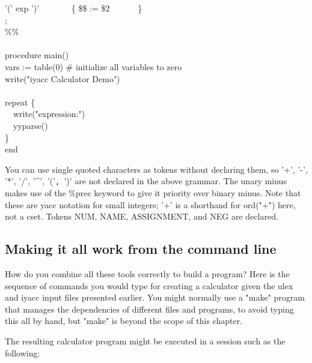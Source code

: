 {\>   {\textbar} '(' exp
')' \ \ \ \ \ \ \ \{ \$\$ := \$2
\ \ \ \ \ \ \} \\
\>   ; \\
\%\% \\
\ \\
procedure main() \\
\>   vars := table(0) \# initialize all variables to zero \\
\>   write("iyacc Calculator Demo") \\
\ \\
\>   repeat \{ \\
\>   \ \ write("expression:")  \\
\>   \ \ yyparse() \\
\>   \} \\
end
}

You can use single quoted characters as tokens without declaring them,
so \textsf{'+'},
\textsf{'-'},
\textsf{'*'},
\textsf{'/'},
\textsf{'\^{}'},
\textsf{'('}\texttt{,
}\textsf{')'} are not declared in the
above grammar. The unary minus makes use of the \textsf{\%prec} keyword
to give it priority over binary minus. Note that these are
\textsf{yacc} notation for small integers;
\textsf{'+'} is a shorthand for
\textsf{ord("+")} here, not a cset. Tokens
NUM, NAME, ASSIGNMENT, and NEG are declared.


\subsection{Making it all work from the command line}

How do you combine all these tools correctly to build a program? Here is the
sequence of commands you would type for creating a calculator given the ulex and
iyacc input files presented earlier. You might normally use a
"make" program that manages the dependencies of
different files and programs, to avoid typing this all by hand, but
"make" is beyond the scope of this chapter.


\bigskip


The resulting calculator program might be executed in a session such as
the following:

